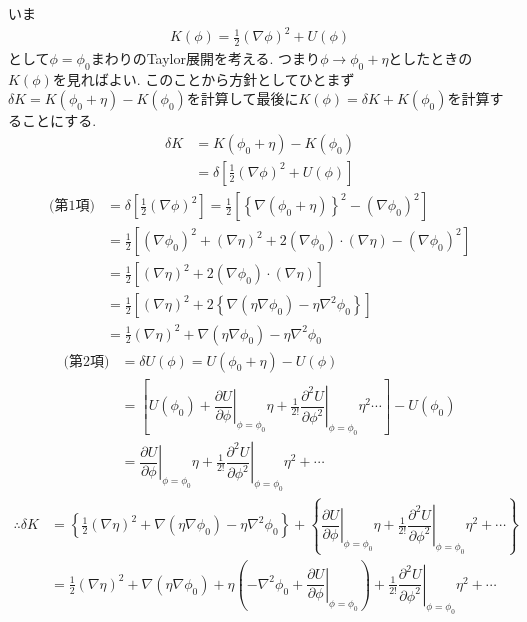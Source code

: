 \documentclass[dvipdfmx,11pt,a4paper,oneside,openany]{jsbook}
\begin{document}
いま
\begin{align*}
    K(\phi)=\frac{1}{2}(\nabla \phi)^2+U(\phi)
\end{align*}
として$\phi=\phi_0$まわりのTaylor展開を考える. つまり$\phi\rightarrow \phi_0+\eta$としたときの$K(\phi)$を見ればよい. このことから方針としてひとまず$\delta K=K(\phi_0+\eta)-K(\phi_0)$を計算して最後に$K(\phi)=\delta K+K(\phi_0)$を計算することにする.
\begin{align*}
    \delta K & =K(\phi_0+\eta)-K(\phi_0)                             \\
             & =\delta\left[\frac{1}{2}(\nabla\phi)^2+U(\phi)\right]
\end{align*}
\begin{align*}
    \text{(第1項)} & =\delta\left[\frac{1}{2}(\nabla\phi)^2\right]=\frac{1}{2}\left[\left\{\nabla(\phi_0+\eta)\right\}^2-(\nabla\phi_0)^2\right] \\
                   & =\frac{1}{2}\left[(\nabla\phi_0)^2+(\nabla\eta)^2+2(\nabla\phi_0)\cdot(\nabla\eta)-(\nabla\phi_0)^2\right]                  \\
                   & =\frac{1}{2}\left[(\nabla\eta)^2+2(\nabla\phi_0)\cdot(\nabla\eta)\right]                                                    \\
                   & =\frac{1}{2}\left[(\nabla\eta)^2+2\left\{\nabla(\eta\nabla\phi_0)-\eta\nabla^2\phi_0\right\}\right]                         \\
                   & =\frac{1}{2}(\nabla\eta)^2+\nabla(\eta\nabla\phi_0)-\eta\nabla^2\phi_0
\end{align*}
\begin{align*}
    \text{(第2項)} & =\delta U(\phi)=U(\phi_0+\eta)-U(\phi)                                                                                                                                                      \\
                   & =\left[U(\phi_0)+\left.\dfrac{\partial U}{\partial \phi}\right|_{\phi=\phi_0}\eta+\frac{1}{2!}\left.\dfrac{\partial^2 U}{\partial \phi^2}\right|_{\phi=\phi_0}\eta^2\cdots\right]-U(\phi_0) \\
                   & =\left.\dfrac{\partial U}{\partial \phi}\right|_{\phi=\phi_0}\eta+\frac{1}{2!}\left.\dfrac{\partial^2 U}{\partial \phi^2}\right|_{\phi=\phi_0}\eta^2+\cdots
\end{align*}
\begin{align*}
    \therefore \delta K & =\left\{\frac{1}{2}(\nabla\eta)^2+\nabla(\eta\nabla\phi_0)-\eta\nabla^2\phi_0\right\}+\left\{\left.\dfrac{\partial U}{\partial \phi}\right|_{\phi=\phi_0}\eta+\frac{1}{2!}\left.\dfrac{\partial^2 U}{\partial \phi^2}\right|_{\phi=\phi_0}\eta^2+\cdots\right\} \\
                        & =\frac{1}{2}(\nabla\eta)^2+\nabla(\eta\nabla\phi_0)+\eta\left(-\nabla^2\phi_0+\left.\dfrac{\partial U}{\partial \phi}\right|_{\phi=\phi_0}\right)+\frac{1}{2!}\left.\dfrac{\partial^2 U}{\partial \phi^2}\right|_{\phi=\phi_0}\eta^2+\cdots
\end{align*}
\end{document}
